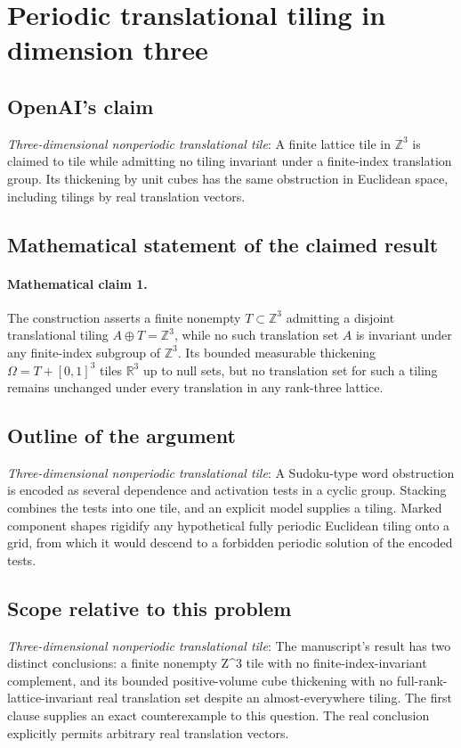 \documentclass[11pt]{article}
\begin{document}
\section*{Periodic translational tiling in dimension three}

\subsection{OpenAI's claim}
\textit{Three-dimensional nonperiodic translational tile}: A finite lattice tile in $\mathbb Z^3$ is claimed to tile while admitting no tiling invariant under a finite-index translation group. Its thickening by unit cubes has the same obstruction in Euclidean space, including tilings by real translation vectors.

\subsection{Mathematical statement of the claimed result}
\paragraph{Mathematical claim 1.} The construction asserts a finite nonempty $T\subset\mathbb Z^3$ admitting a disjoint translational tiling $A\oplus T=\mathbb Z^3$, while no such translation set $A$ is invariant under any finite-index subgroup of $\mathbb Z^3$. Its bounded measurable thickening $\Omega=T+[0,1]^3$ tiles $\mathbb R^3$ up to null sets, but no translation set for such a tiling remains unchanged under every translation in any rank-three lattice.

\subsection{Outline of the argument}
\textit{Three-dimensional nonperiodic translational tile}: A Sudoku-type word obstruction is encoded as several dependence and activation tests in a cyclic group. Stacking combines the tests into one tile, and an explicit model supplies a tiling. Marked component shapes rigidify any hypothetical fully periodic Euclidean tiling onto a grid, from which it would descend to a forbidden periodic solution of the encoded tests.

\subsection{Scope relative to this problem}
\textit{Three-dimensional nonperiodic translational tile}: The manuscript’s result has two distinct conclusions: a finite nonempty Z\textasciicircum{}3 tile with no finite-index-invariant complement, and its bounded positive-volume cube thickening with no full-rank-lattice-invariant real translation set despite an almost-everywhere tiling. The first clause supplies an exact counterexample to this question. The real conclusion explicitly permits arbitrary real translation vectors.
\end{document}

